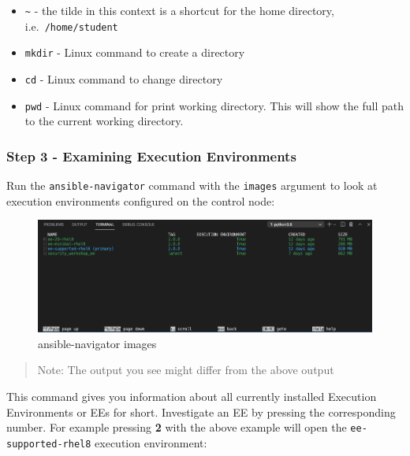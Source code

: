 \begin{itemize}
\tightlist
\item
  \texttt{\textasciitilde{}} - the tilde in this context is a shortcut
  for the home directory, i.e.~\texttt{/home/student}
\item
  \texttt{mkdir} - Linux command to create a directory
\item
  \texttt{cd} - Linux command to change directory
\item
  \texttt{pwd} - Linux command for print working directory. This will
  show the full path to the current working directory.
\end{itemize}

\hypertarget{step-3---examining-execution-environments}{%
\subsubsection{Step 3 - Examining Execution
Environments}\label{step-3---examining-execution-environments}}

Run the \texttt{ansible-navigator} command with the \texttt{images}
argument to look at execution environments configured on the control
node:

\begin{Shaded}
\begin{Highlighting}[]
\ExtensionTok{$}
\end{Highlighting}
\end{Shaded}

\begin{figure}[H]
\centering
\includegraphics{images/01_navigator-images.png}
\caption{ansible-navigator images}
\end{figure}

\begin{quote}
Note: The output you see might differ from the above output
\end{quote}

This command gives you information about all currently installed
Execution Environments or EEs for short. Investigate an EE by pressing
the corresponding number. For example pressing \textbf{2} with the above
example will open the \texttt{ee-supported-rhel8} execution environment:

